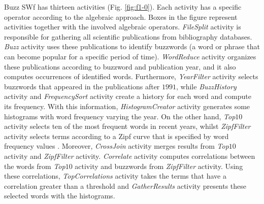 Buzz SWf has thirteen activities (Fig. \ref{fig:f1-0}). 
Each activity has a specific operator according to the algebraic approach. 
Boxes in the figure represent activities together with the involved algebraic operators. 
\textit{FileSplit} activity is responsible for gathering all scientific publications from bibliography databases. 
\textit{Buzz} activity uses these publications to identify buzzwords (a word or phrase that can become popular for a specific period of time).
\textit{WordReduce} activity organizes these publications according to buzzword and publication year, 
and it also computes occurrences of identified words. 
Furthermore, \textit{YearFilter} activity selects buzzwords that appeared in the publications after $1991$, 
while \textit{BuzzHistory} activity and \textit{FrequencySort} activity create a history for each word and compute its frequency. 
With this information, \textit{HistogramCreator} activity generates some histograms with word frequency varying the year. 
On the other hand, \textit{Top$10$} activity selects ten of the most frequent words in recent years, 
whilst \textit{ZipfFilter} activity selects terms according to a Zipf curve that is specified by word frequency values \cite{Tarapanoff2001}. 
Moreover, \textit{CrossJoin} activity merges results from \textit{Top$10$} activity and \textit{ZipfFilter} activity. 
\textit{Correlate} activity computes correlations between the words from \textit{Top$10$} activity and buzzwords from \textit{ZipfFilter} activity. 
Using these correlations, \textit{TopCorrelations} activity takes the terms that have a correlation greater than a threshold 
and \textit{GatherResults} activity presents these selected words with the histograms. 

